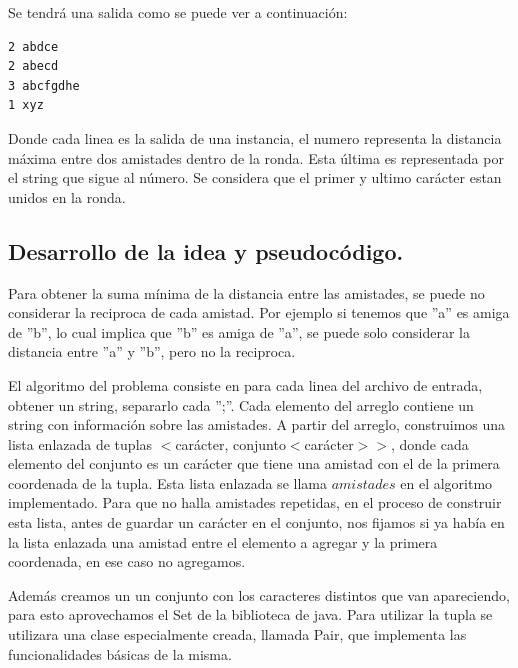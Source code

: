 Se tendrá una salida como se puede ver a continuación:

\begin{verbatim}
2 abdce
2 abecd
3 abcfgdhe
1 xyz
\end{verbatim}

Donde cada linea es la salida de una instancia, el numero representa la distancia máxima entre dos amistades dentro de la ronda. Esta última es representada por el string que sigue al número. Se considera que el primer y ultimo carácter estan unidos en la ronda.

\subsection{Desarrollo de la idea y pseudocódigo.}




Para obtener la suma mínima de la distancia entre las amistades, se puede no considerar la reciproca de cada amistad. Por ejemplo si tenemos que ''a'' es amiga de ''b'', lo cual implica que ''b'' es amiga de ''a'', se puede solo considerar la distancia entre ''a'' y ''b'', pero no la reciproca.

El algoritmo del problema consiste en para cada linea del archivo de entrada, obtener un string, separarlo cada '';''. Cada elemento del arreglo contiene un string con información sobre las amistades. A partir del arreglo, construimos una lista enlazada de tuplas $ < $carácter, conjunto$ < $carácter$ > > $, donde cada elemento del conjunto es un carácter que tiene una amistad con el de la primera coordenada de la tupla. Esta lista enlazada se llama $ amistades $ en el algoritmo implementado. Para que no halla amistades repetidas, en el proceso de construir esta lista, antes de guardar un carácter en el conjunto, nos fijamos si ya había en la lista enlazada una amistad entre el elemento a agregar y la primera coordenada, en ese caso no agregamos.

Además creamos un un conjunto con los caracteres distintos que van apareciendo, para esto aprovechamos el Set de la biblioteca de java. Para utilizar la tupla se utilizara una clase especialmente creada, llamada Pair, que implementa las funcionalidades básicas de la misma. 

